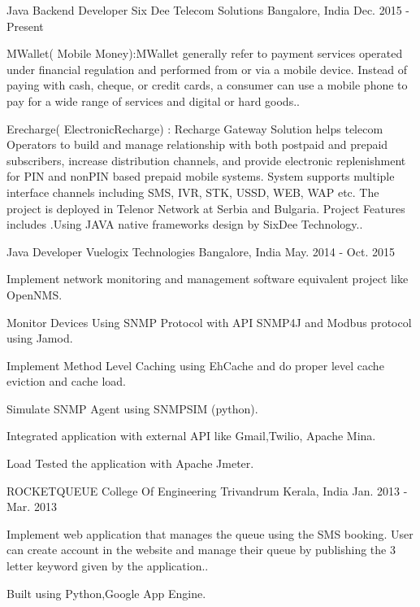 \begin{cventries}
  \cventry
    {Java Backend Developer }
    {Six Dee Telecom Solutions}
    {Bangalore, India}
    {Dec. 2015 - Present}
    {
      \begin{cvitems}
        \item { MWallet(
Mobile Money):MWallet generally refer to payment services operated under financial regulation and performed from or via a
mobile device. Instead of paying with cash, cheque, or credit cards, a consumer can use a mobile phone to pay for a
wide range of services and digital or hard goods..}
        \item {Erecharge(
ElectronicRecharge)
:
Recharge Gateway Solution helps telecom Operators to build and manage relationship with both postpaid and
prepaid subscribers, increase distribution channels, and provide electronic replenishment for PIN and nonPIN
based
prepaid mobile systems. System supports multiple interface channels including SMS, IVR, STK, USSD, WEB,
WAP etc. The project is deployed in Telenor Network at Serbia and Bulgaria. Project Features includes
.Using JAVA native frameworks design by SixDee Technology..}
      \end{cvitems}
    }
  \cventry
    {Java Developer}
    {Vuelogix Technologies}
    {Bangalore, India}
    {May. 2014 - Oct. 2015}
    {
      \begin{cvitems}
        \item {Implement network monitoring and management software equivalent project like OpenNMS.}
        \item {Monitor Devices Using SNMP Protocol with API SNMP4J and Modbus protocol using Jamod.}
        \item {Implement Method Level Caching using EhCache and do proper level cache eviction and cache load.}
        \item {Simulate SNMP Agent using SNMPSIM (python).}
        \item {Integrated application with external API like Gmail,Twilio, Apache Mina.}
        \item {Load Tested the application with Apache Jmeter.}
      \end{cvitems}
    }
  \cventry
    {ROCKETQUEUE}
    {College Of Engineering Trivandrum}
    {Kerala, India}
    {Jan. 2013 - Mar. 2013}
    {
      \begin{cvitems}
        \item {Implement web application that manages the queue using the SMS booking.
User can create account in the website and manage their queue by publishing the 3 letter keyword given by the
application..}
        \item {Built using Python,Google App Engine.}
      \end{cvitems} 
    }
    

\end{cventries}
